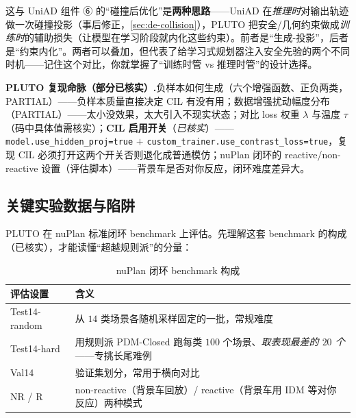 \begin{insight}
这与 UniAD 组件 ⑥ 的“碰撞后优化”是\textbf{两种思路}——UniAD 在\emph{推理时}对输出轨迹做一次碰撞投影（事后修正，\cref{sec:de-collision}），PLUTO 把安全/几何约束做成\emph{训练时}的辅助损失（让模型在学习阶段就内化这些约束）。前者是“生成-投影”，后者是“约束内化”。两者可以叠加，但代表了给学习式规划器注入安全先验的两个不同时机——记住这个对比，你就掌握了“训练时管 vs 推理时管”的设计选择。
\end{insight}

\begin{note}
\textbf{PLUTO 复现命脉（部分已核实）.}\;负样本如何生成（六个增强函数、正负两类，PARTIAL）——负样本质量直接决定 CIL 有没有用；数据增强扰动幅度分布（PARTIAL）——太小没效果，太大引入不现实状态；对比 loss 权重 $\lambda$ 与温度 $\tau$（码中具体值需核实）；\textbf{CIL 启用开关}（\emph{已核实}）——\texttt{model.use\_hidden\_proj=true} $+$ \texttt{custom\_trainer.use\_contrast\_loss=true}，复现 CIL 必须打开这两个开关否则退化成普通模仿；nuPlan 闭环的 reactive/non-reactive 设置（评估脚本）——背景车是否对你反应，闭环难度差异大。
\end{note}

\subsection{关键实验数据与陷阱}
\label{sec:de-pluto-exp}

PLUTO 在 nuPlan 标准闭环 benchmark 上评估。先理解这套 benchmark 的构成（已核实），才能读懂“超越规则派”的分量：

\begin{table}[H]\centering\small
\caption{nuPlan 闭环 benchmark 构成}
\label{tab:de-nuplan-bench}
\begin{tabular}{p{} p{}}
\toprule
评估设置 & 含义 \\
\midrule
Test14-random & 从 $14$ 类场景各随机采样固定的一批，常规难度 \\
Test14-hard & 用规则派 PDM-Closed 跑每类 $100$ 个场景、\emph{取表现最差的 $20$ 个}——专挑长尾难例 \\
Val14 & 验证集划分，常用于横向对比 \\
NR / R & non-reactive（背景车回放）/ reactive（背景车用 IDM 等对你反应）两种模式 \\
\bottomrule
\end{tabular}
\end{table}

